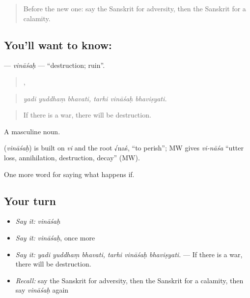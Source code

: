 \label{lesson:SA-C375-vinasah}



\begin{quote}
Before the new one: say the Sanskrit for adversity, then the Sanskrit for a calamity.
\end{quote}

\subsection*{You'll want to know: }
\textbf{} — \emph{vināśaḥ} — \textquotedblleft{}destruction; ruin\textquotedblright{}.

\begin{quote}
  ,   
\end{quote}

\begin{quote}
\emph{yadi yuddhaṃ bhavati, tarhi vināśaḥ bhaviṣyati.}
\end{quote}

\begin{quote}
If there is a war, there will be destruction.
\end{quote}

A masculine noun.

\begin{cousinweb}
\textbf{} (\emph{vināśaḥ}) is built on \emph{vi} and the root √naś, \textquotedblleft{}to perish\textquotedblright{}; MW gives \emph{vi-nāśa} \textquotedblleft{}utter loss, annihilation, destruction, decay\textquotedblright{} (MW).
\end{cousinweb}

\begin{grammarlens}[title={What you've built}]
One more word for saying what happens if.
\end{grammarlens}

\subsection*{Your turn}
\begin{itemize}
\raggedright
  \item \emph{Say it:} \emph{vināśaḥ}
  \item \emph{Say it:} \emph{vināśaḥ}, once more
  \item \emph{Say it:} \emph{yadi yuddhaṃ bhavati, tarhi vināśaḥ bhaviṣyati.} — If there is a war, there will be destruction.
  \item \emph{Recall:} say the Sanskrit for adversity, then the Sanskrit for a calamity, then say \emph{vināśaḥ} again
\end{itemize}

